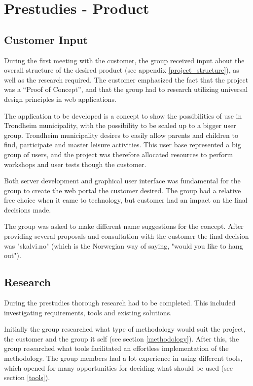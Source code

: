 
\chapter{Prestudies - Product}

\section{Customer Input}
\label{Customer input}
During the first meeting with the customer, the group received input about the overall structure of the desired product (see appendix \ref{project_structure}), as well as the research required. The customer emphasized the fact that the project was a “Proof of Concept”, and that the group had to research utilizing universal design principles in web applications.

The application to be developed is a concept to show the possibilities of use in Trondheim municipality, with the possibility to be scaled up to a bigger user group. Trondheim municipality desires to easily allow parents and children to find, participate and master leisure activities. This user base represented a big group of users, and the project was therefore allocated resources to perform workshops and user tests though the customer.

Both server development and graphical user interface was fundamental for the group to create the web portal the customer desired. The group had a relative free choice when it came to technology, but customer had an impact on the final decisions made.

The group was asked to make different name suggestions for the concept. After providing several proposals and consultation with the customer the final decision was "skalvi.no" (which is the Norwegian way of saying, "would you like to hang out").

\section{Research}
During the prestudies thorough research had to be completed. This included investigating requirements, tools and existing solutions.

Initially the group researched what type of methodology would suit the project, the customer and the group it self (see section \ref{methodology}). After this, the group researched what tools facilitated an effortless implementation of the methodology. The group members had a lot experience in using different tools, which opened for many opportunities for deciding what should be used (see section \ref{tools}).

